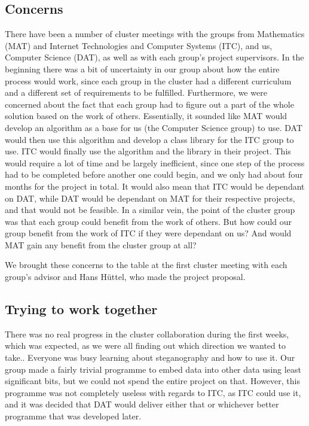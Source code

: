 \subsection*{Concerns}
There have been a number of cluster meetings with the groups from Mathematics (MAT) and Internet Technologies and Computer Systems (ITC), and us, Computer Science (DAT), as well as with each group's project supervisors.
In the beginning there was a bit of uncertainty in our group about how the entire process would work, since each group in the cluster had a different curriculum and a different set of requirements to be fulfilled.
Furthermore, we were concerned about the fact that each group had to figure out a part of the whole solution based on the work of others.
Essentially, it sounded like MAT would develop an algorithm as a base for us (the Computer Science group) to use.
DAT would then use this algorithm and develop a class library for the ITC group to use.
ITC would finally use the algorithm and the library in their project.
This would require a lot of time and be largely inefficient, since one step of the process had to be completed before another one could begin, and we only had about four months for the project in total.
It would also mean that ITC would be dependant on DAT, while DAT would be dependant on MAT for their respective projects, and that would not be feasible.
In a similar vein, the point of the cluster group was that each group could benefit from the work of others.
But how could our group benefit from the work of ITC if they were dependant on us? And would MAT gain any benefit from the cluster group at all?

We brought these concerns to the table at the first cluster meeting with each group's advisor and Hans Hüttel, who made the project proposal.

\subsection*{Trying to work together}
There was no real progress in the cluster collaboration during the first weeks, which was expected, as we were all finding out which direction we wanted to take..
Everyone was busy learning about steganography and how to use it.
Our group made a fairly trivial programme to embed data into other data using least significant bits, but we could not spend the entire project on that. However, this programme was not completely useless with regards to ITC, as ITC could use it, and it was decided that DAT would deliver either that or whichever better programme that was developed later.

